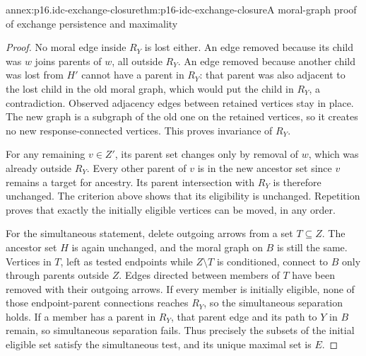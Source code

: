 \begin{annexitem}{annex:p16.idc-exchange-closure}{thm:p16-idc-exchange-closure}{A moral-graph proof of exchange persistence and maximality}
\begin{proof}
No moral edge inside \(R_Y\) is lost either. An edge removed
because its child was \(w\) joins parents of \(w\), all
outside \(R_Y\). An edge removed because another child was
lost from \(H'\) cannot have a parent in \(R_Y\): that
parent was also adjacent to the lost child in the old moral
graph, which would put the child in \(R_Y\), a contradiction.
Observed adjacency edges between retained vertices stay in place.
The new graph is a subgraph of the old one on the retained
vertices, so it creates no new response-connected vertices. This
proves invariance of \(R_Y\).

For any remaining \(v\in Z'\), its parent set changes only
by removal of \(w\), which was already outside \(R_Y\).
Every other parent of \(v\) is in the new ancestor set since
\(v\) remains a target for ancestry. Its parent intersection
with \(R_Y\) is therefore unchanged. The criterion above
shows that its eligibility is unchanged. Repetition proves that
exactly the initially eligible vertices can be moved, in any order.

For the simultaneous statement, delete outgoing arrows from a
set \(T\subseteq Z\). The ancestor set \(H\) is again
unchanged, and the moral graph on \(B\) is still the same.
Vertices in \(T\), left as tested endpoints while \(Z\setminus T\)
is conditioned, connect to \(B\) only through parents outside
\(Z\). Edges directed between members of \(T\) have been
removed with their outgoing arrows. If every member is initially
eligible, none of those endpoint-parent connections reaches
\(R_Y\), so the simultaneous separation holds. If a member
has a parent in \(R_Y\), that parent edge and its path to
\(Y\) in \(B\) remain, so simultaneous separation fails.
Thus precisely the subsets of the initial eligible set satisfy
the simultaneous test, and its unique maximal set is \(E\).
\end{proof}
\end{annexitem}

